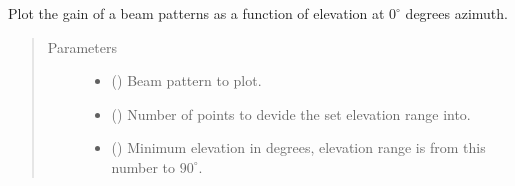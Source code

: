 \documentclass[letterpaper,10pt,english]{sphinxmanual}
\begin{document}

\begin{fulllineitems}
\label{\detokenize{modules/antenna:antenna.plot_gain}}
Plot the gain of a beam patterns as a function of elevation at \(0^\circ\) degrees azimuth.
\begin{quote}\begin{description}
\item[{Parameters}] \leavevmode\begin{itemize}
\item {} 
 ({\hyperref[\detokenize{modules/antenna:antenna.BeamPattern}]{}}) \textendash{} Beam pattern to plot.

\item {} 
 () \textendash{} Number of points to devide the set elevation range into.

\item {} 
 () \textendash{} Minimum elevation in degrees, elevation range is from this number to \(90^\circ\).

\end{itemize}

\end{description}\end{quote}

\end{fulllineitems}

\end{document}
